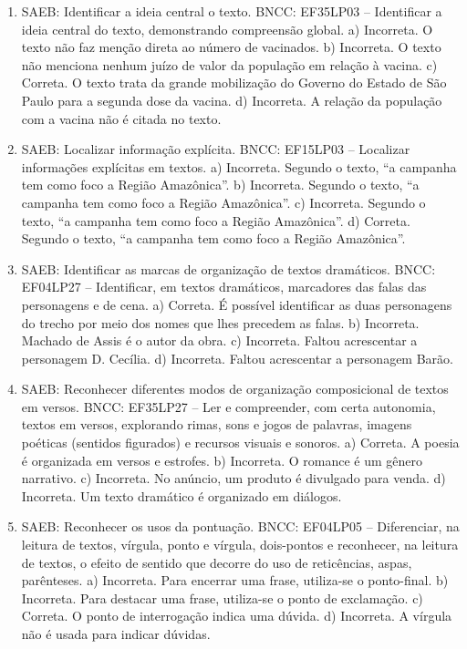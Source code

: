 \begin{enumerate}
\item
SAEB: Identificar a ideia central o texto. BNCC: EF35LP03 -- Identificar a ideia central do texto, demonstrando compreensão global. a) Incorreta. O texto não faz menção direta ao número de vacinados. b) Incorreta. O texto não menciona nenhum juízo de valor da população em relação à vacina. c) Correta. O texto trata da grande mobilização do Governo do Estado de São Paulo para a segunda dose da vacina. d) Incorreta. A relação da população com a vacina não é citada no texto.

\item
SAEB: Localizar informação explícita. BNCC: EF15LP03 -- Localizar informações explícitas em textos. a) Incorreta. Segundo o texto, ``a campanha tem como foco a Região Amazônica''. b) Incorreta. Segundo o texto, ``a campanha tem como foco a Região Amazônica''. c) Incorreta. Segundo o texto, ``a campanha tem como foco a Região Amazônica''. d) Correta. Segundo o texto, ``a campanha tem como foco a Região Amazônica''.

\item
SAEB: Identificar as marcas de organização de textos dramáticos. BNCC: EF04LP27 -- Identificar, em textos dramáticos, marcadores das falas das personagens e de cena. a) Correta. É possível identificar as duas personagens do trecho por meio dos nomes que lhes precedem as falas. b) Incorreta. Machado de Assis é o autor da obra. c) Incorreta. Faltou acrescentar a personagem D. Cecília. d) Incorreta. Faltou acrescentar a personagem Barão.

\item
SAEB: Reconhecer diferentes modos de organização composicional de textos em versos. BNCC: EF35LP27 -- Ler e compreender, com certa autonomia, textos em versos, explorando rimas, sons e jogos de palavras, imagens poéticas (sentidos figurados) e recursos visuais e sonoros. a) Correta. A poesia é organizada em versos e estrofes. b) Incorreta. O romance é um gênero narrativo. c) Incorreta. No anúncio, um produto é divulgado para venda. d) Incorreta. Um texto dramático é organizado em diálogos.

\item
SAEB: Reconhecer os usos da pontuação. BNCC: EF04LP05 -- Diferenciar, na leitura de textos, vírgula, ponto e vírgula, dois-pontos e reconhecer, na leitura de textos, o efeito de sentido que decorre do uso de reticências, aspas, parênteses. a) Incorreta. Para encerrar uma frase, utiliza-se o ponto-final. b) Incorreta. Para destacar uma frase, utiliza-se o ponto de exclamação. c) Correta. O ponto de interrogação indica uma dúvida. d) Incorreta. A vírgula não é usada para indicar dúvidas.


\end{enumerate}
